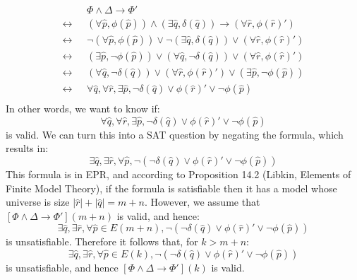 \documentclass[12pt]{article}
\theoremstyle{definition}
\theoremstyle{remark}
\newcommand{\msp}{\text{ }}
\begin{document}
\begin{align*}
  & \msp \Phi \land \Delta \rightarrow \Phi'\\
  \leftrightarrow & \msp (\forall \hat{p}, \phi(\hat{p})) \land (\exists \hat{q}, \delta(\hat{q})) \rightarrow (\forall \hat{r}, \phi(\hat{r})')\\
  \leftrightarrow & \msp \neg(\forall \hat{p}, \phi(\hat{p})) \lor \neg(\exists \hat{q}, \delta(\hat{q})) \lor (\forall \hat{r}, \phi(\hat{r})')\\
  \leftrightarrow & \msp (\exists \hat{p}, \neg\phi(\hat{p})) \lor (\forall \hat{q}, \neg\delta(\hat{q})) \lor (\forall \hat{r}, \phi(\hat{r})')\\
  \leftrightarrow & \msp (\forall \hat{q}, \neg\delta(\hat{q})) \lor (\forall \hat{r}, \phi(\hat{r})') \lor (\exists \hat{p}, \neg\phi(\hat{p}))\\
  \leftrightarrow & \msp \forall \hat{q}, \forall \hat{r}, \exists \hat{p}, \neg\delta(\hat{q}) \lor \phi(\hat{r})' \lor \neg\phi(\hat{p})\\
\end{align*}
In other words, we want to know if:
$$\forall \hat{q}, \forall \hat{r}, \exists \hat{p}, \neg\delta(\hat{q}) \lor \phi(\hat{r})' \lor \neg\phi(\hat{p})$$
is valid.  We can turn this into a SAT question by negating the formula, which results in:
$$\exists \hat{q}, \exists \hat{r}, \forall \hat{p}, \neg(\neg\delta(\hat{q}) \lor \phi(\hat{r})' \lor \neg\phi(\hat{p}))$$
This formula is in EPR, and according to Proposition 14.2 (Libkin, Elements of Finite Model Theory), if the formula is satisfiable then it has a model whose universe is size $|\hat{r}| + |\hat{q}| = m + n$.  However, we assume that $[\Phi\land\Delta \rightarrow \Phi'](m+n)$ is valid, and hence:
$$\exists \hat{q}, \exists \hat{r}, \forall \hat{p} \in E(m+n), \neg(\neg\delta(\hat{q}) \lor \phi(\hat{r})' \lor \neg\phi(\hat{p}))$$
is unsatisfiable.  Therefore it follows that, for $k>m+n$:
$$\exists \hat{q}, \exists \hat{r}, \forall \hat{p} \in E(k), \neg(\neg\delta(\hat{q}) \lor \phi(\hat{r})' \lor \neg\phi(\hat{p}))$$
is unsatisfiable, and hence $[\Phi\land\Delta \rightarrow \Phi'](k)$ is valid.


%
%
\end{document}
